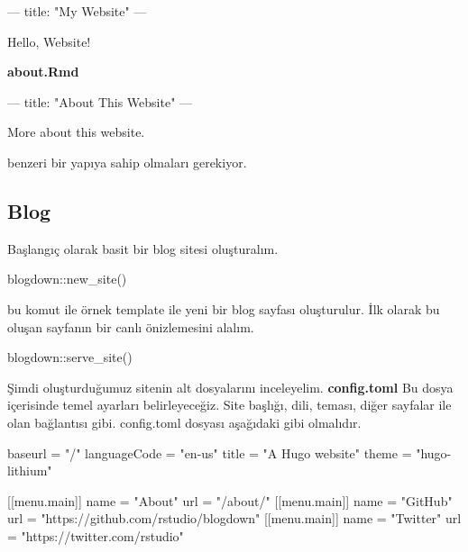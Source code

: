 \documentclass[]{book}
\newenvironment{Shaded}{\begin{snugshade}}{\end{snugshade}}
\newcommand{\BaseNTok}[1]{\textcolor[rgb]{0.00,0.00,0.81}{#1}}
\newcommand{\NormalTok}[1]{#1}
\begin{document}
\begin{Shaded}
\begin{Highlighting}[]
\NormalTok{---}
\NormalTok{title: "My Website"}
\NormalTok{---}

\NormalTok{Hello, Website!}
\end{Highlighting}
\end{Shaded}

\textbf{about.Rmd}

\begin{Shaded}
\begin{Highlighting}[]
\NormalTok{---}
\NormalTok{title: "About This Website"}
\NormalTok{---}

\NormalTok{More about this website.}
\end{Highlighting}
\end{Shaded}

benzeri bir yapıya sahip olmaları gerekiyor.

\subsection{Blog}\label{blog}

Başlangıç olarak basit bir blog sitesi oluşturalım.

\begin{Shaded}
\begin{Highlighting}[]
\NormalTok{blogdown::new_site()}
\end{Highlighting}
\end{Shaded}

bu komut ile örnek template ile yeni bir blog sayfası oluşturulur. İlk
olarak bu oluşan sayfanın bir canlı önizlemesini alalım.

\begin{Shaded}
\begin{Highlighting}[]
\NormalTok{blogdown::serve_site()}
\end{Highlighting}
\end{Shaded}

Şimdi oluşturduğumuz sitenin alt dosyalarını inceleyelim.
\textbf{config.toml} Bu dosya içerisinde temel ayarları belirleyeceğiz.
Site başlığı, dili, teması, diğer sayfalar ile olan bağlantısı gibi.
config.toml dosyası aşağıdaki gibi olmalıdır.

\begin{Shaded}
\begin{Highlighting}[]
\NormalTok{baseurl = "/"}
\NormalTok{languageCode = "en-us"}
\NormalTok{title = "A Hugo website"}
\NormalTok{theme = "hugo-lithium"}

\NormalTok{[[menu.main]]}
\BaseNTok{    name = "About"}
\BaseNTok{    url = "/about/"}
\NormalTok{[[menu.main]]}
\BaseNTok{    name = "GitHub"}
\BaseNTok{    url = "https://github.com/rstudio/blogdown"}
\NormalTok{[[menu.main]]}
\BaseNTok{    name = "Twitter"}
\BaseNTok{    url = "https://twitter.com/rstudio"}
\end{Highlighting}
\end{Shaded}
\end{document}
